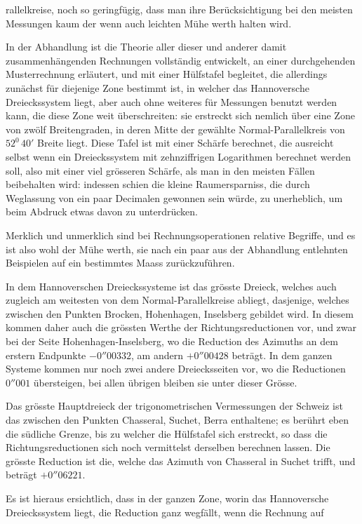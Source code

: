 %
rallelkreise, noch so geringfügig, dass man ihre Berücksichtigung bei den meisten Messungen kaum der wenn auch leichten Mühe werth halten wird.

In der Abhandlung ist die Theorie aller dieser und anderer damit zusammenhängenden Rechnungen vollständig entwickelt, an einer durchgehenden Musterrechnung erläutert, und mit einer Hülfstafel begleitet, die allerdings zunächst für diejenige Zone bestimmt ist, in welcher das Hannoversche Dreieckssystem liegt, aber auch ohne weiteres für Messungen benutzt werden kann, die diese Zone weit überschreiten: sie erstreckt sich nemlich über eine Zone von zwölf Breitengraden, in deren Mitte der gewählte Normal-Parallelkreis von \(52^0\,40'\) Breite liegt. Diese Tafel ist mit einer Schärfe berechnet, die ausreicht selbst wenn ein Dreieckssystem mit zehnziffrigen Logarithmen berechnet werden soll, also mit einer viel grösseren Schärfe, als man in den meisten Fällen beibehalten wird: indessen schien die kleine Raumersparniss, die durch Weglassung von ein paar Decimalen gewonnen sein würde, zu unerheblich, um beim Abdruck etwas davon zu unterdrücken.

Merklich und unmerklich sind bei Rechnungsoperationen relative Begriffe, und es ist also wohl der Mühe werth, sie nach ein paar aus der Abhandlung entlehnten Beispielen auf ein bestimmtes Maass zurückzuführen.

In dem Hannoverschen Dreieckssysteme ist das grösste Dreieck, welches auch zugleich am weitesten von dem Normal-Parallelkreise abliegt, dasjenige, welches zwischen den Punkten Brocken, Hohenhagen, Inselsberg gebildet wird. In diesem kommen daher auch die grössten Werthe der Richtungsreductionen vor, und zwar bei der Seite Hohenhagen-Inselsberg, wo die Reduction des Azimuths an dem erstern Endpunkte \(-0''00332\), am andern \(+0''00428\) beträgt. In dem ganzen Systeme kommen nur noch zwei andere Dreiecksseiten vor, wo die Reductionen \(0''001\) übersteigen, bei allen übrigen bleiben sie unter dieser Grösse.

Das grösste Hauptdreieck der trigonometrischen Vermessungen der Schweiz ist das zwischen den Punkten Chasseral, Suchet, Berra enthaltene; es berührt eben die südliche Grenze, bis zu welcher die Hülfstafel sich erstreckt, so dass die Richtungsreductionen sich noch vermittelst derselben berechnen lassen. Die grösste Reduction ist die, welche das Azimuth von Chasseral in Suchet trifft, und beträgt \(+0''06221\).

Es ist hieraus ersichtlich, dass in der ganzen Zone, worin das Hannoversche Dreieckssystem liegt, die Reduction ganz wegfällt, wenn die Rechnung auf
